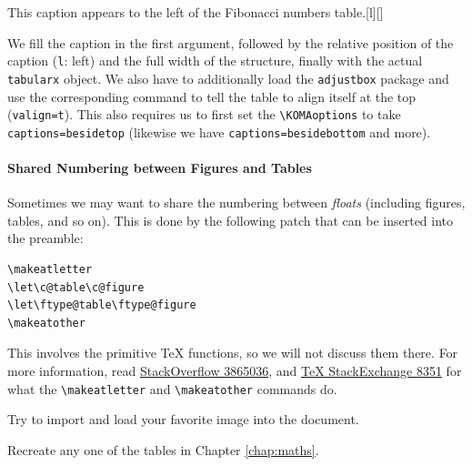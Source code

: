\begin{table}[ht]
\begin{captionbeside}{This caption appears to the left of the Fibonacci numbers table.}[l][\textwidth]{}
\end{captionbeside}
\label{tab:fib}
\end{table}
We fill the caption in the first argument, followed by the relative position of the caption (\verb|l|: left) and the full width of the structure, finally with the actual \verb|tabularx| object. We also have to additionally load the \verb|adjustbox| package and use the corresponding command to tell the table to align itself at the top (\verb|valign=t|). This also requires us to first set the \texttt{\textbackslash KOMAoptions} to take \verb|captions=besidetop| (likewise we have \verb|captions=besidebottom| and more).

\paragraph{Shared Numbering between Figures and Tables}
Sometimes we may want to share the numbering between \textit{floats} (including figures, tables, and so on). This is done by the following patch that can be inserted into the preamble:
\begin{lstlisting}
\makeatletter
\let\c@table\c@figure
\let\ftype@table\ftype@figure
\makeatother
\end{lstlisting}
This involves the primitive \TeX{} functions, so we will not discuss them there. For more information, read \href{https://stackoverflow.com/questions/3865036/using-a-single-count-for-figures-and-tables-in-latex}{StackOverflow 3865036}, and \href{https://tex.stackexchange.com/questions/8351/what-do-makeatletter-and-makeatother-do}{\TeX{} StackExchange 8351} for what the \texttt{\textbackslash makeatletter} and \texttt{\textbackslash makeatother} commands do.

\begin{exercisebox}
\begin{Exercise}
Try to import and load your favorite image into the document. 
\end{Exercise}
\begin{Exercise}
Recreate any one of the tables in Chapter \ref{chap:maths}.
\end{Exercise}
\end{exercisebox}

